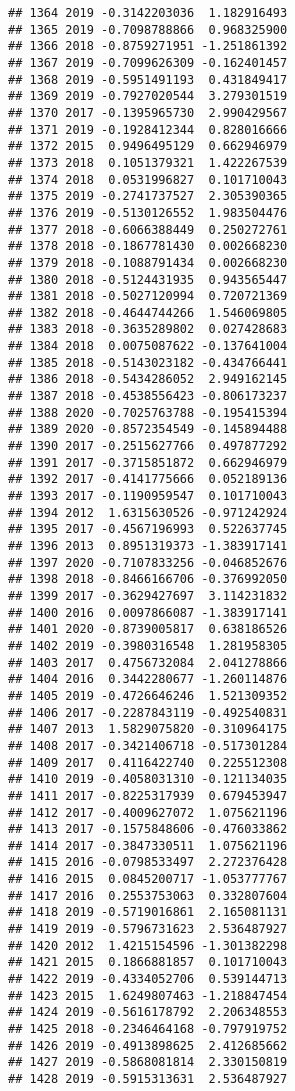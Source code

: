 \documentclass[
]{article}
\begin{document}
\begin{verbatim}
## 1364 2019 -0.3142203036  1.182916493
## 1365 2019 -0.7098788866  0.968325900
## 1366 2018 -0.8759271951 -1.251861392
## 1367 2019 -0.7099626309 -0.162401457
## 1368 2019 -0.5951491193  0.431849417
## 1369 2019 -0.7927020544  3.279301519
## 1370 2017 -0.1395965730  2.990429567
## 1371 2019 -0.1928412344  0.828016666
## 1372 2015  0.9496495129  0.662946979
## 1373 2018  0.1051379321  1.422267539
## 1374 2018  0.0531996827  0.101710043
## 1375 2019 -0.2741737527  2.305390365
## 1376 2019 -0.5130126552  1.983504476
## 1377 2018 -0.6066388449  0.250272761
## 1378 2018 -0.1867781430  0.002668230
## 1379 2018 -0.1088791434  0.002668230
## 1380 2018 -0.5124431935  0.943565447
## 1381 2018 -0.5027120994  0.720721369
## 1382 2018 -0.4644744266  1.546069805
## 1383 2018 -0.3635289802  0.027428683
## 1384 2018  0.0075087622 -0.137641004
## 1385 2018 -0.5143023182 -0.434766441
## 1386 2018 -0.5434286052  2.949162145
## 1387 2018 -0.4538556423 -0.806173237
## 1388 2020 -0.7025763788 -0.195415394
## 1389 2020 -0.8572354549 -0.145894488
## 1390 2017 -0.2515627766  0.497877292
## 1391 2017 -0.3715851872  0.662946979
## 1392 2017 -0.4141775666  0.052189136
## 1393 2017 -0.1190959547  0.101710043
## 1394 2012  1.6315630526 -0.971242924
## 1395 2017 -0.4567196993  0.522637745
## 1396 2013  0.8951319373 -1.383917141
## 1397 2020 -0.7107833256 -0.046852676
## 1398 2018 -0.8466166706 -0.376992050
## 1399 2017 -0.3629427697  3.114231832
## 1400 2016  0.0097866087 -1.383917141
## 1401 2020 -0.8739005817  0.638186526
## 1402 2019 -0.3980316548  1.281958305
## 1403 2017  0.4756732084  2.041278866
## 1404 2016  0.3442280677 -1.260114876
## 1405 2019 -0.4726646246  1.521309352
## 1406 2017 -0.2287843119 -0.492540831
## 1407 2013  1.5829075820 -0.310964175
## 1408 2017 -0.3421406718 -0.517301284
## 1409 2017  0.4116422740  0.225512308
## 1410 2019 -0.4058031310 -0.121134035
## 1411 2017 -0.8225317939  0.679453947
## 1412 2017 -0.4009627072  1.075621196
## 1413 2017 -0.1575848606 -0.476033862
## 1414 2017 -0.3847330511  1.075621196
## 1415 2016 -0.0798533497  2.272376428
## 1416 2015  0.0845200717 -1.053777767
## 1417 2016  0.2553753063  0.332807604
## 1418 2019 -0.5719016861  2.165081131
## 1419 2019 -0.5796731623  2.536487927
## 1420 2012  1.4215154596 -1.301382298
## 1421 2015  0.1866881857  0.101710043
## 1422 2019 -0.4334052706  0.539144713
## 1423 2015  1.6249807463 -1.218847454
## 1424 2019 -0.5616178792  2.206348553
## 1425 2018 -0.2346464168 -0.797919752
## 1426 2019 -0.4913898625  2.412685662
## 1427 2019 -0.5868081814  2.330150819
## 1428 2019 -0.5915313631  2.536487927

\end{verbatim}
\end{document}
